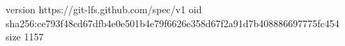version https://git-lfs.github.com/spec/v1
oid sha256:ce793f48cd67dfb4e0e501b4e79f6626e358d67f2a91d7b408886697775fc454
size 1157
